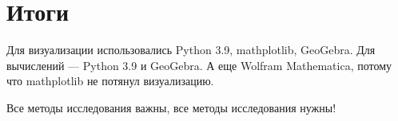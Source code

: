 \section{Итоги}



    Для визуализации использовались Python 3.9, mathplotlib, GeoGebra. Для вычислений --- Python 3.9 и GeoGebra. А еще Wolfram Mathematica, потому что mathplotlib не потянул визуализацию.

    Все методы исследования важны, все методы исследования нужны!
